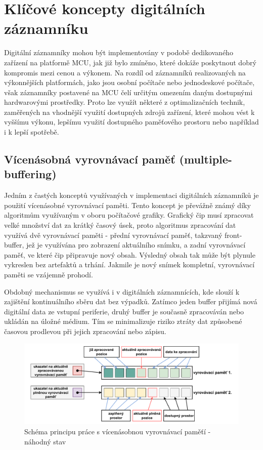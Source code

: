 \section{Klíčové koncepty digitálních záznamníku} 
\label{klicove_koncepty_digitalnich_zaznamniku}
Digitální záznamníky mohou být implementovány v podobě dedikovaného zařízení na platformě MCU, jak již bylo zmíněno, které dokáže poskytnout dobrý kompromis mezi cenou a výkonem. Na rozdíl od záznamníků realizovaných na výkonnějších platformách, jako jsou osobní počítače nebo jednodeskové počítače, však záznamníky postavené na MCU čelí určitým omezením daným dostupnými hardwarovými prostředky. Proto lze využít některé z optimalizačních technik, zaměřených na vhodnější využití dostupných zdrojů zařízení, které mohou vést k vyššímu výkonu, lepšímu využití dostupného paměťového prostoru nebo například i k lepší spotřebě.

\subsection{Vícenásobná vyrovnávací paměť (multiple-buffering)}
\label{vicenasobna_vyrovnavaci_pamet}
Jedním z častých konceptů využívaných v implementaci digitálních záznamníků je použití vícenásobné vyrovnávací paměti. Tento koncept je převážně známý díky algoritmům využívaným v oboru počítačové grafiky. Grafický čip musí zpracovat velké množství dat za krátký časový úsek, proto algoritmus zpracování dat využívá dvě vyrovnávací paměti - přední vyrovnávací paměť, takzvaný front-buffer, jež je využívána pro zobrazení aktuálního snímku, a zadní vyrovnávací paměť, ve které čip připravuje nový obsah. Výsledný obsah tak může být plynule vykreslen bez artefaktů a trhání. Jakmile je nový snímek kompletní, vyrovnávací paměti se vzájemně prohodí. \cite{double_buffering_model}

Obdobný mechanismus se využívá i v digitálních záznamnících, kde slouží k zajištění kontinuálního sběru dat bez výpadků. Zatímco jeden buffer přijímá nová digitální data ze vstupní periferie, druhý buffer je současně zpracováván nebo ukládán na úložné médium. Tím se minimalizuje riziko ztráty dat způsobené časovou prodlevou při jejich zpracování nebo zápisu.

\begin{figure}[h]
    \centering
    \includegraphics[width=1.00\textwidth]{obrazky-figures/multiple_buffering-1.pdf}
    
    \caption{Schéma principu práce s vícenásobnou vyrovnávací paměťí - náhodný stav}
    \label{fig:multiple-buffering-1}
\end{figure}

